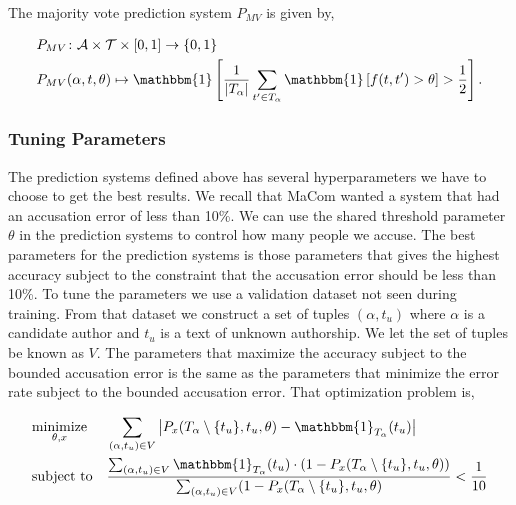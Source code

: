 \begin{definition}
    \label{def:majority_vote_prediction_system}

    The majority vote prediction system $P_{MV}$ is given by,

    \begin{align}
        &P_{MV} \colon \mathcal{A} \times \mathcal{T} \times [0, 1] \rightarrow
            \{0, 1\} \\
        &P_{MV}(\alpha, t, \theta) \mapsto \mathbbm{1}\left[
                \frac{1}{|T_\alpha|} \sum_{t' \in T_\alpha} \mathbbm{1}\left[
                    f(t, t') > \theta
                \right] > \frac{1}{2}
            \right].
    \end{align}

\end{definition}


\subsubsection{Tuning Parameters}
\label{subsubsec:tuning_parameters}

The prediction systems defined above has several hyperparameters we have to
choose to get the best results. We recall that MaCom wanted a system that had an
accusation error of less than 10\%. We can use the shared threshold parameter
$\theta$ in the prediction systems to control how many people we accuse. The
best parameters for the prediction systems is those parameters that gives the
highest accuracy subject to the constraint that the accusation error should be
less than 10\%. To tune the parameters we use a validation dataset not seen
during training. From that dataset we construct a set of tuples $(\alpha, t_u)$
where $\alpha$ is a candidate author and $t_u$ is a text of unknown authorship.
We let the set of tuples be known as $V$. The parameters that maximize the
accuracy subject to the bounded accusation error is the same as the parameters
that minimize the error rate subject to the bounded accusation error. That
optimization problem is,

\begin{equation}
    \label{eq:prediction_system_minimization}
    \begin{aligned}
        & \underset{\theta, x}{\text{minimize}}
        & & \sum_{(\alpha, t_u) \in V} \left|
            P_x(T_\alpha \setminus \{t_u\}, t_u, \theta) -
            \mathbbm{1}_{T_\alpha}(t_u)
        \right| \\
        & \text{subject to}
        & & \frac{\sum_{(\alpha, t_u) \in V} \mathbbm{1}_{T_\alpha}(t_u) \cdot
            \left(1 - P_x(T_\alpha \setminus \{t_u\}, t_u, \theta)\right)}
{\sum_{(\alpha, t_u) \in V} (1 - P_x(T_\alpha \setminus \{t_u\}, t_u, \theta)} <
            \frac{1}{10}
    \end{aligned}
\end{equation}

